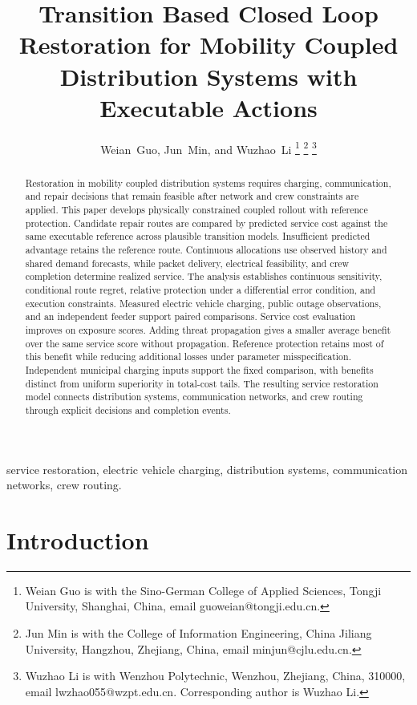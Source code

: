 \documentclass[journal]{IEEEtran}
\title{Transition Based Closed Loop Restoration for Mobility Coupled Distribution Systems with Executable Actions}
\author{Weian~Guo, Jun~Min, and Wuzhao~Li%
\thanks{Weian Guo is with the Sino-German College of Applied Sciences, Tongji
University, Shanghai, China, email guoweian@tongji.edu.cn.}%
\thanks{Jun Min is with the College of Information Engineering, China Jiliang
University, Hangzhou, Zhejiang, China, email minjun@cjlu.edu.cn.}%
\thanks{Wuzhao Li is with Wenzhou Polytechnic, Wenzhou, Zhejiang, China, 310000,
email lwzhao055@wzpt.edu.cn. Corresponding author is Wuzhao Li.}}
\begin{document}
\maketitle

\begin{abstract}
Restoration in mobility coupled distribution systems requires charging,
communication, and repair decisions that remain feasible after network and
crew constraints are applied.  This paper develops physically constrained
coupled rollout with reference protection.  Candidate repair routes are
compared by predicted service cost against the same executable reference
across plausible transition models.  Insufficient predicted advantage retains
the reference route.  Continuous allocations use observed history and shared
demand forecasts, while packet delivery, electrical feasibility, and crew
completion determine realized service.  The analysis establishes continuous
sensitivity, conditional route regret, relative protection under a differential
error condition, and execution constraints.  Measured electric vehicle
charging, public outage observations, and an independent feeder support
paired comparisons.  Service cost evaluation improves on exposure scores.
Adding threat propagation gives a smaller average benefit over the same
service score without propagation.  Reference protection retains most of
this benefit while reducing additional losses under parameter misspecification.
Independent municipal charging inputs support the fixed comparison, with
benefits distinct from uniform superiority in total-cost tails.  The resulting
service restoration model connects distribution systems, communication
networks, and crew routing through explicit decisions and completion events.
\end{abstract}

\begin{IEEEkeywords}
service restoration, electric vehicle charging, distribution systems,
communication networks, crew routing.
\end{IEEEkeywords}

\section{Introduction}
\label{sec:introduction}
\end{document}
